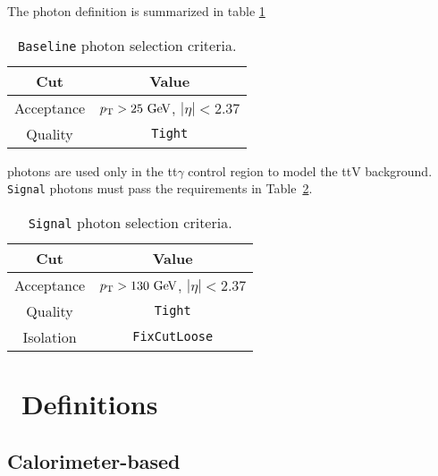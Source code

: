\indent The photon definition is summarized in table \ref{tb:photons:baseline} \\

\begin{table}[htp]
  \begin{center}
    \begin{tabular}{c|c} \hline \hline
      Cut & Value \\ \hline \hline
      Acceptance & $\pT > 25 \gev$, $|\eta| < 2.37$ \\ \hline
      Quality & {\tt Tight} \\ \hline
      \hline
    \end{tabular}
  \caption{{\tt Baseline} photon selection criteria.} 
  \end{center}
  \label{tb:photons:baseline}
\end{table}%

 photons are used only in the tt$\gamma$ control region to model the ttV background.  {\tt Signal} photons must pass the requirements in Table~\ref{tb:photons}.  \\%

\begin{table}[htp]
  \begin{center}
    \begin{tabular}{c|c} \hline \hline
      Cut & Value \\ \hline \hline
      Acceptance & $\pT > 130 \gev$, $|\eta| < 2.37$ \\ \hline
      Quality & {\tt Tight} \\ \hline
      Isolation &  {\tt FixCutLoose} \\ \hline
      \hline
    \end{tabular}
  \caption{{\tt Signal} photon selection criteria.} 
  \end{center}
  \label{tb:photons}
\end{table}%

\section{\met\ Definitions} 
\label{sec:Selection_MET}

\subsection{\boldmath Calorimeter-based \met}

